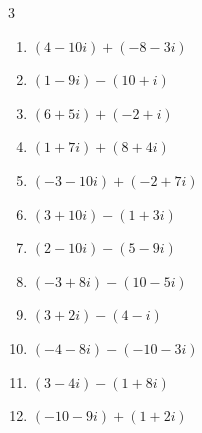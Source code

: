 \begin{multicols}{3}
\begin{enumerate}
        \phantom{$\displaystyle =10i$}

  \item $\displaystyle (4-10i) + (-8-3i)$

        \phantom{$\displaystyle =-4-13i$}

\columnbreak %

\resetques

  \item $\displaystyle (1-9i) - (10+i)$

        \phantom{$\displaystyle =-9-10i$}

  \item $\displaystyle (6+5i) + (-2+i)$

        \phantom{$\displaystyle =4+6i$}

  \item $\displaystyle (1+7i) + (8+4i)$

        \phantom{$\displaystyle =9+11i$}

  \item $\displaystyle (-3-10i) + (-2+7i)$

        \phantom{$\displaystyle =-5-3i$}

  \item $\displaystyle (3+10i) - (1+3i)$

        \phantom{$\displaystyle =2+7i$}

  \item $\displaystyle (2-10i) - (5-9i)$

        \phantom{$\displaystyle =-3-i$}

  \item $\displaystyle (-3+8i) - (10-5i)$

        \phantom{$\displaystyle =-13+13i$}

  \item $\displaystyle (3+2i) - (4-i)$

        \phantom{$\displaystyle =-1+3i$}

  \item $\displaystyle (-4-8i) - (-10-3i)$

        \phantom{$\displaystyle =6-5i$}

  \item $\displaystyle (3-4i) - (1+8i)$

        \phantom{$\displaystyle =2-12i$}

  \item $\displaystyle (-10-9i) + (1+2i)$

        \phantom{$\displaystyle =-9-7i$}


\end{enumerate}
\end{multicols}
